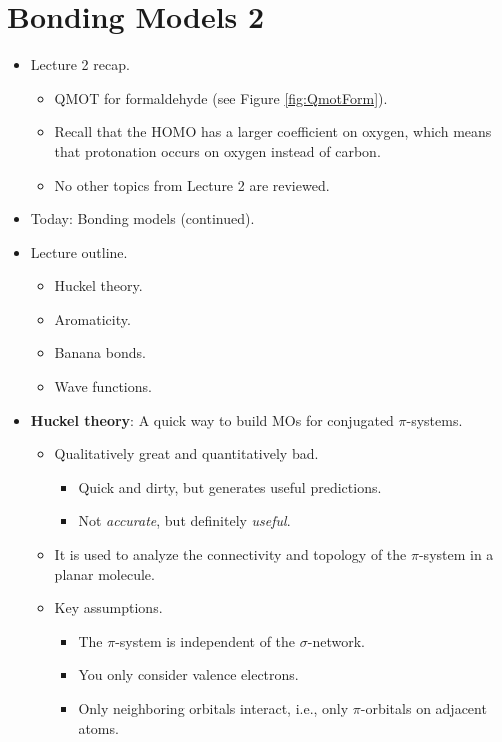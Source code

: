 \documentclass[../notes.tex]{subfiles}
\begin{document}
\section{Bonding Models 2}
\begin{itemize}
    \item {}Lecture 2 recap.
    \begin{itemize}
        \item QMOT for formaldehyde (see Figure \ref{fig:QmotForm}).
        \item Recall that the HOMO has a larger coefficient on oxygen, which means that protonation occurs on oxygen instead of carbon.
        \item No other topics from Lecture 2 are reviewed.
    \end{itemize}
    \item Today: Bonding models (continued).
    \pagebreak
    \item Lecture outline.
    \begin{itemize}
        \item Huckel theory.
        \item Aromaticity.
        \item Banana bonds.
        \item Wave functions.
    \end{itemize}
    \item \textbf{Huckel theory}: A quick way to build MOs for conjugated $\pi$-systems.
    \begin{itemize}
        \item Qualitatively great and quantitatively bad.
        \begin{itemize}
            \item Quick and dirty, but generates useful predictions.
            \item Not \emph{accurate}, but definitely \emph{useful}.
        \end{itemize}
        \item It is used to analyze the connectivity and topology of the $\pi$-system in a planar molecule.
        \item Key assumptions.
        \begin{itemize}
            \item The $\pi$-system is independent of the $\sigma$-network.
            \item You only consider valence electrons.
            \item Only neighboring orbitals interact, i.e., only $\pi$-orbitals on adjacent atoms.

\end{itemize}
\end{itemize}
\end{itemize}
\end{document}
